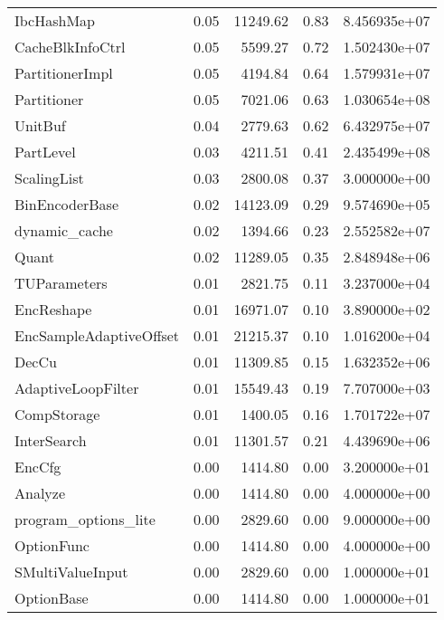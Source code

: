 \begin{tabular}{lrrrr}
IbcHashMap                &   0.05 &  11249.62 &      0.83 &  8.456935e+07 \\
CacheBlkInfoCtrl          &   0.05 &   5599.27 &      0.72 &  1.502430e+07 \\
PartitionerImpl           &   0.05 &   4194.84 &      0.64 &  1.579931e+07 \\
Partitioner               &   0.05 &   7021.06 &      0.63 &  1.030654e+08 \\
UnitBuf                   &   0.04 &   2779.63 &      0.62 &  6.432975e+07 \\
PartLevel                 &   0.03 &   4211.51 &      0.41 &  2.435499e+08 \\
ScalingList               &   0.03 &   2800.08 &      0.37 &  3.000000e+00 \\
BinEncoderBase            &   0.02 &  14123.09 &      0.29 &  9.574690e+05 \\
dynamic\_cache             &   0.02 &   1394.66 &      0.23 &  2.552582e+07 \\
Quant                     &   0.02 &  11289.05 &      0.35 &  2.848948e+06 \\
TUParameters              &   0.01 &   2821.75 &      0.11 &  3.237000e+04 \\
EncReshape                &   0.01 &  16971.07 &      0.10 &  3.890000e+02 \\
EncSampleAdaptiveOffset   &   0.01 &  21215.37 &      0.10 &  1.016200e+04 \\
DecCu                     &   0.01 &  11309.85 &      0.15 &  1.632352e+06 \\
AdaptiveLoopFilter        &   0.01 &  15549.43 &      0.19 &  7.707000e+03 \\
CompStorage               &   0.01 &   1400.05 &      0.16 &  1.701722e+07 \\
InterSearch               &   0.01 &  11301.57 &      0.21 &  4.439690e+06 \\
EncCfg                    &   0.00 &   1414.80 &      0.00 &  3.200000e+01 \\
Analyze                   &   0.00 &   1414.80 &      0.00 &  4.000000e+00 \\
program\_options\_lite      &   0.00 &   2829.60 &      0.00 &  9.000000e+00 \\
OptionFunc                &   0.00 &   1414.80 &      0.00 &  4.000000e+00 \\
SMultiValueInput          &   0.00 &   2829.60 &      0.00 &  1.000000e+01 \\
OptionBase                &   0.00 &   1414.80 &      0.00 &  1.000000e+01 \\

\end{tabular}
